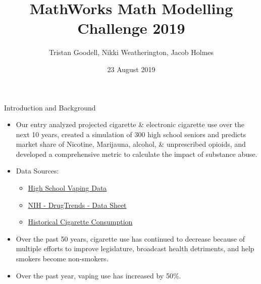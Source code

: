 \documentclass{beamer}
\title{MathWorks Math Modelling Challenge 2019}
\author{Tristan Goodell, Nikki Weatherington, Jacob Holmes}
\institute[]{Arkansas School for Mathematics, Sciences, and the Arts}
\date{23 August 2019}
\begin{document}
\maketitle
\begin{frame}{Introduction and Background}
    \begin{itemize}
    \item Our entry analyzed projected cigarette \& electronic cigarette use over the next 10 years, created a simulation of 300 high school seniors and predicts market share of Nicotine, Marijauna, alcohol, \& unprescribed opioids, and developed a comprehensive metric to calculate the impact of substance abuse.
        \item Data Sources:
        \begin{itemize}
            \item \href{https://m3challenge.siam.org/sites/default/files/uploads/high_school_vaping_data.xlsx}{High School Vaping Data}
            \item \href{https://m3challenge.siam.org/sites/default/files/uploads/NIH-DrugTrends-DataSheet\%20.xlsx}{NIH - DrugTrends - Data Sheet}
            \item \href{https://m3challenge.siam.org/sites/default/files/uploads/Figure_Adult\%20per\%20capita\%20cigarette\%20consumption\%20and\%20major\%20smoking\%20and\%20health\%20events_US_1900_2012.pdf}{Historical Cigarette Consumption}
        \end{itemize}
        \item Over the past 50 years, cigarette use has continued to decrease because of multiple efforts to improve legislature, broadcast health detriments, and help smokers become non-smokers.
        \item Over the past year, vaping use has increased by 50\%.  
    \end{itemize}
   
\end{frame}
\end{document}
